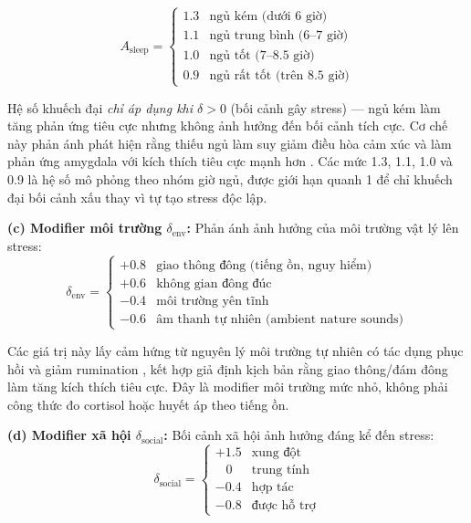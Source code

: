 \begin{equation}
    A_{\text{sleep}} = \begin{cases}
        1.3 & \text{ngủ kém (dưới 6 giờ)} \\
        1.1 & \text{ngủ trung bình (6--7 giờ)} \\
        1.0 & \text{ngủ tốt (7--8.5 giờ)} \\
        0.9 & \text{ngủ rất tốt (trên 8.5 giờ)}
    \end{cases}
\end{equation}

Hệ số khuếch đại \textit{chỉ áp dụng khi $\delta > 0$} (bối cảnh gây stress) — ngủ kém làm tăng phản ứng tiêu cực nhưng không ảnh hưởng đến bối cảnh tích cực. Cơ chế này phản ánh phát hiện rằng thiếu ngủ làm suy giảm điều hòa cảm xúc và làm phản ứng amygdala với kích thích tiêu cực mạnh hơn \cite{yoo2007sleep}. Các mức 1.3, 1.1, 1.0 và 0.9 là hệ số mô phỏng theo nhóm giờ ngủ, được giới hạn quanh 1 để chỉ khuếch đại bối cảnh xấu thay vì tự tạo stress độc lập.

\textbf{(c) Modifier môi trường $\delta_{\text{env}}$:} Phản ánh ảnh hưởng của môi trường vật lý lên stress:
\begin{equation}
    \delta_{\text{env}} = \begin{cases}
        +0.8 & \text{giao thông đông (tiếng ồn, nguy hiểm)} \\
        +0.6 & \text{không gian đông đúc} \\
        -0.4 & \text{môi trường yên tĩnh} \\
        -0.6 & \text{âm thanh tự nhiên (ambient nature sounds)}
    \end{cases}
\end{equation}

Các giá trị này lấy cảm hứng từ nguyên lý môi trường tự nhiên có tác dụng phục hồi và giảm rumination \cite{bratman2015nature}, kết hợp giả định kịch bản rằng giao thông/đám đông làm tăng kích thích tiêu cực. Đây là modifier môi trường mức nhỏ, không phải công thức đo cortisol hoặc huyết áp theo tiếng ồn.

\textbf{(d) Modifier xã hội $\delta_{\text{social}}$:} Bối cảnh xã hội ảnh hưởng đáng kể đến stress:
\begin{equation}
    \delta_{\text{social}} = \begin{cases}
        +1.5 & \text{xung đột} \\
        \;\;\;0   & \text{trung tính} \\
        -0.4 & \text{hợp tác} \\
        -0.8 & \text{được hỗ trợ}
    \end{cases}
\end{equation}

